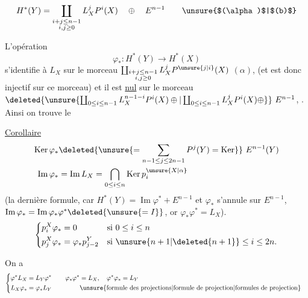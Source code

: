 \[
 H^*(Y)=\coprod_{\substack{i+j\leq n-1\\i,j\geq0}}L_X^jP^i(X)\quad\oplus\quad E^{n-1}\tag*{\unsure{$(\alpha)$|$(b)$}}
\]

L'opération
\[
\varphi_*:H^*(Y)\longrightarrow H^*(X)
\]
s'identifie  à $L_X$ sur le morceau $\coprod_{\substack{i+j\leq n-1\\i,j\geq0}}L_X^jP^{\unsure{j|i}}(X)$  $(\alpha)$, (et est  donc injectif sur ce morceau) et il est \uline{nul} sur le morceau $\deleted{\unsure{\coprod_{0\leq i\leq n-1} L_X^{n-1-i}P^i(X)\oplus|\coprod_{0\leq i\leq n-1}L_X^jP^i(X)\oplus}}\ E^{n-1}$, . Ainsi on trouve le

\uline{Corollaire}
\[
\begin{aligned}
\operatorname{Ker}\varphi_* &\deleted{\unsure{=\sum_{n-1\leq j\leq2n-1}P^j(Y)=\operatorname{Ker}}}\ E^{n-1}(Y)\\
\operatorname{Im}\varphi_* &=\operatorname{Im} L_X=\bigcap_{0\leq i\leq n}\operatorname{Ker}p_i^{\unsure{X|\alpha}}
\end{aligned}
\]
(la dernière formule, car $H^*(Y)=\operatorname{Im}\varphi^*+E^{n-1}$ et $\varphi_*$ s'annule sur $E^{n-1}$,  $\operatorname{Im}\varphi_*=\operatorname{Im}\varphi_*\varphi^*\deleted{\unsure{=I}}$, or $\varphi_*\varphi^*=L_X$).
\[
\left\{\begin{aligned}
p_i^X\varphi_*&=0&&\text{si }0\leq i\leq n\\
p_j^X\varphi_*&=\varphi_*p_{j-2}^Y&&\text{si }\unsure{n+1|\deleted{n+1}}\leq i\leq 2n.
\end{aligned}\right.
\]

On a
\[
\begin{aligned}
\left\{\begin{aligned}
\varphi^*L_X&=L_Y\varphi^*\\
L_X\varphi_*&=\varphi_*L_Y
\end{aligned}\right. \qquad&
\begin{aligned}
\varphi_*\varphi^*&=L_X,\quad\varphi^*\varphi_*=L_Y\\
&\text{\unsure{formule des projections|formule de projection|formules de projection}}
\end{aligned}
\end{aligned}
\]

